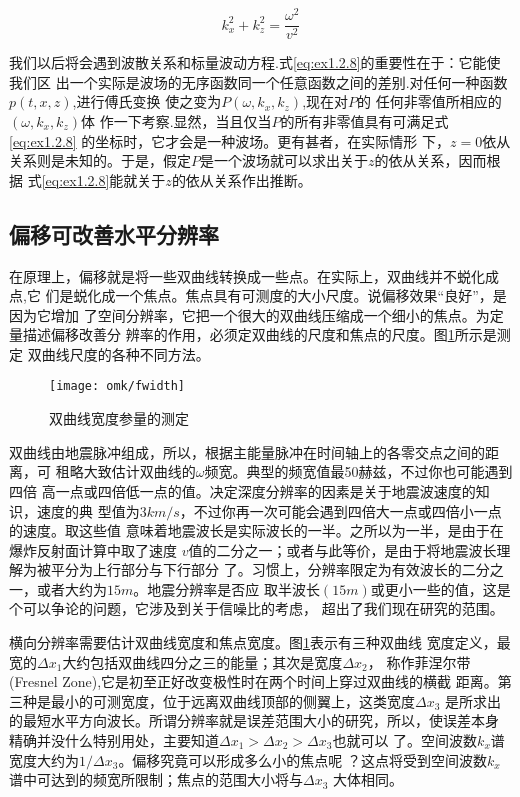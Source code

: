   \begin{equation}
  k^2_{x}+k^2_{z}=\frac{\omega^{2}}{v^{2}}
  \label{eq:ex1.2.8}
  \end{equation}

  我们以后将会遇到波散关系和标量波动方程.式\ref{eq:ex1.2.8}的重要性在于：它能使我们区
  出一个实际是波场的无序函数同一个任意函数之间的差别.对任何一种函数$p(t,x,z)$,进行傅氏变换
  使之变为$P(\omega,k_{x},k_{z})$,现在对$P$的
  任何非零值所相应的$(\omega,k_{x},k_{z})$体
  作一下考察.显然，当且仅当$P$的所有非零值具有可满足式\ref{eq:ex1.2.8}
  的坐标时，它才会是一种波场。更有甚者，在实际情形
  下，$z=0$依从关系则是未知的。于是，假定$P$是一个波场就可以求出关于$z$的依从关系，因而根据
  式\ref{eq:ex1.2.8}能就关于$z$的依从关系作出推断。

\subsection{偏移可改善水平分辨率}
\label{sec:1.2.3}

在原理上，偏移就是将一些双曲线转换成一些点。在实际上，双曲线并不蜕化成点,它
们是蜕化成一个焦点。焦点具有可测度的大小尺度。说偏移效果“良好”，是因为它增加
了空间分辨率，它把一个很大的双曲线压缩成一个细小的焦点。为定量描述偏移改善分
辨率的作用，必须定双曲线的尺度和焦点的尺度。图\ref{fig:omk/fwidth}所示是测定
双曲线尺度的各种不同方法。
\begin{figure}[H]
\centering
\texttt{[image: omk/fwidth]}
\caption[fwidth]{双曲线宽度参量的测定}
\label{fig:omk/fwidth}
\end{figure}
双曲线由地震脉冲组成，所以，根据主能量脉冲在时间轴上的各零交点之间的距离，可
租略大致估计双曲线的$\omega$频宽。典型的频宽值最50赫兹，不过你也可能遇到四倍
高一点或四倍低一点的值。决定深度分辨率的因素是关于地震波速度的知识，速度的典
型值为$3km/s$，不过你再一次可能会遇到四倍大一点或四倍小一点的速度。取这些值
意味着地震波长是实际波长的一半。之所以为一半，是由于在爆炸反射面计算中取了速度
$v$值的二分之一；或者与此等价，是由于将地震波长理解为被平分为上行部分与下行部分
了。习惯上，分辨率限定为有效波长的二分之一，或者大约为$15m$。地震分辨率是否应
取半波长$(15m)$或更小一些的值，这是个可以争论的问题，它涉及到关于信噪比的考虑，
超出了我们现在研究的范围。

横向分辨率需要估计双曲线宽度和焦点宽度。图\ref{fig:omk/fwidth}表示有三种双曲线
宽度定义，最宽的$\Delta x_{1}$大约包括双曲线四分之三的能量；其次是宽度$\Delta x_{2}$，
称作菲涅尔带(Fresnel Zone),它是初至正好改变极性时在两个时间上穿过双曲线的横截
距离。第三种是最小的可测宽度，位于远离双曲线顶部的侧翼上，这类宽度$\Delta x_{3}$
是所求出的最短水平方向波长。所谓分辨率就是误差范围大小的研究，所以，使误差本身
精确并没什么特别用处，主要知道$\Delta x_{1}>\Delta x_{2}>\Delta x_{3}$也就可以
了。空间波数$k_{x}$谱宽度大约为$1/\Delta x_{3}$。偏移究竟可以形成多么小的焦点呢
？这点将受到空间波数$k_{x}$谱中可达到的频宽所限制；焦点的范围大小将与$\Delta x_{3}$
大体相同。

